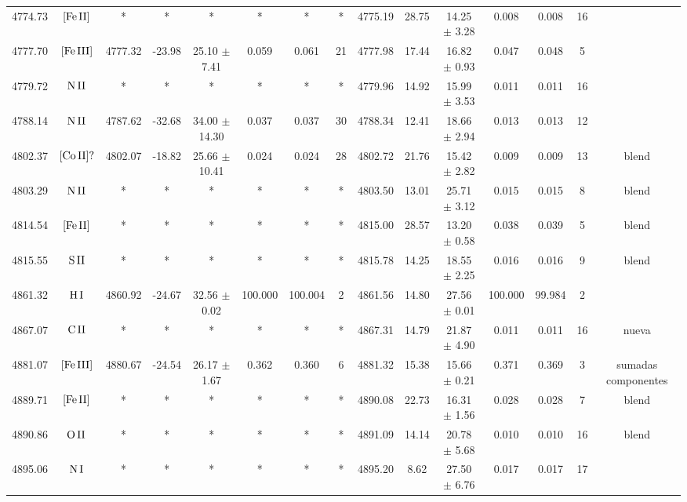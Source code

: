 \documentclass{article}
\begin{document}
\begin{table*}
\begin{adjustbox}{width=\textwidth}
\begin{tabular}{ccccccccccccccc}
4774.73 & $\mbox{[Fe}\thinspace \mbox{II]}$ & * & * & * & * & * & * & 4775.19 & 28.75 & 14.25 $\pm$ 3.28 & 0.008 & 0.008 & 16 &  \\
4777.70 & $\mbox{[Fe}\thinspace \mbox{III]}$ & 4777.32 & -23.98 & 25.10 $\pm$ 7.41 & 0.059 & 0.061 & 21 & 4777.98 & 17.44 & 16.82 $\pm$ 0.93 & 0.047 & 0.048 & 5 &  \\
4779.72 & $\mbox{N}\thinspace \mbox{II}$ & * & * & * & * & * & * & 4779.96 & 14.92 & 15.99 $\pm$ 3.53 & 0.011 & 0.011 & 16 &  \\
4788.14 & $\mbox{N}\thinspace \mbox{II}$ & 4787.62 & -32.68 & 34.00 $\pm$ 14.30 & 0.037 & 0.037 & 30 & 4788.34 & 12.41 & 18.66 $\pm$ 2.94 & 0.013 & 0.013 & 12 &  \\
4802.37 & $\mbox{[Co}\thinspace \mbox{II]?}$ & 4802.07 & -18.82 & 25.66 $\pm$ 10.41 & 0.024 & 0.024 & 28 & 4802.72 & 21.76 & 15.42 $\pm$ 2.82 & 0.009 & 0.009 & 13 &  blend \\
4803.29 & $\mbox{N}\thinspace \mbox{II}$ & * & * & * & * & * & * & 4803.50 & 13.01 & 25.71 $\pm$ 3.12 & 0.015 & 0.015 & 8 &  blend \\
4814.54 & $\mbox{[Fe}\thinspace \mbox{II]}$ & * & * & * & * & * & * & 4815.00 & 28.57 & 13.20 $\pm$ 0.58 & 0.038 & 0.039 & 5 &  blend \\
4815.55 & $\mbox{S}\thinspace \mbox{II}$ & * & * & * & * & * & * & 4815.78 & 14.25 & 18.55 $\pm$ 2.25 & 0.016 & 0.016 & 9 &  blend \\
4861.32 & $\mbox{H}\thinspace \mbox{I}$ & 4860.92 & -24.67 & 32.56 $\pm$ 0.02 & 100.000 & 100.004 & 2 & 4861.56 & 14.80 & 27.56 $\pm$ 0.01 & 100.000 & 99.984 & 2 &  \\
4867.07 & $\mbox{C}\thinspace \mbox{II}$ & * & * & * & * & * & * & 4867.31 & 14.79 & 21.87 $\pm$ 4.90 & 0.011 & 0.011 & 16 &  nueva \\
4881.07 & $\mbox{[Fe}\thinspace \mbox{III]}$ & 4880.67 & -24.54 & 26.17 $\pm$ 1.67 & 0.362 & 0.360 & 6 & 4881.32 & 15.38 & 15.66 $\pm$ 0.21 & 0.371 & 0.369 & 3 &  sumadas componentes \\
4889.71 & $\mbox{[Fe}\thinspace \mbox{II]}$ & * & * & * & * & * & * & 4890.08 & 22.73 & 16.31 $\pm$ 1.56 & 0.028 & 0.028 & 7 &  blend \\
4890.86 & $\mbox{O}\thinspace \mbox{II}$ & * & * & * & * & * & * & 4891.09 & 14.14 & 20.78 $\pm$ 5.68 & 0.010 & 0.010 & 16 &  blend \\
4895.06 & $\mbox{N}\thinspace \mbox{I}$ & * & * & * & * & * & * & 4895.20 & 8.62 & 27.50 $\pm$ 6.76 & 0.017 & 0.017 & 17 &  \\

\end{tabular}
\end{adjustbox}
\end{table*}
\end{document}
